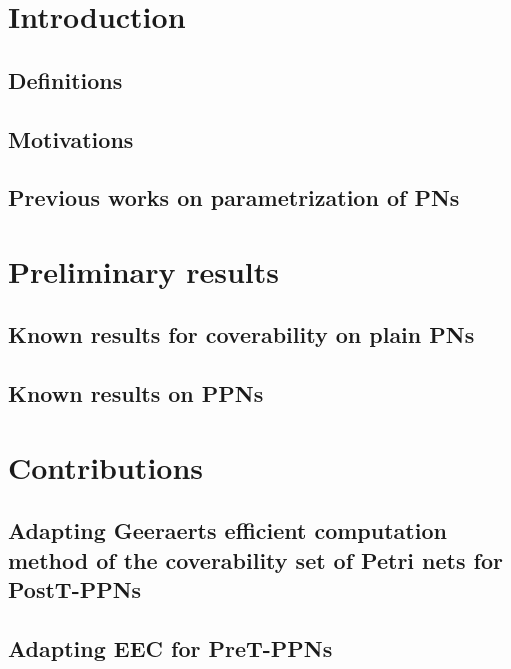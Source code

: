 \documentclass[11pt,a4paper,oneside,draft]{book}
\theoremstyle{plain}
\theoremstyle{definition}
\theoremstyle{remark}
\begin{document}
\thispagestyle{empty} 
\setcounter{page}{0}
\tableofcontents
\acresetall

\mainmatter
\setcounter{page}{1}

\chapter{Introduction}

\section{Definitions}

\section{Motivations}


\section{Previous works on parametrization of \acp{PN}}


\chapter{Preliminary results}
\section{Known results for coverability on plain \acp{PN}}

\section{Known results on \acp{PPN}}


\chapter{Contributions}
\section{Adapting Geeraerts efficient computation method of the coverability set of Petri nets for PostT-\acp{PPN}}
\section{Adapting \ac{EEC} for PreT-\acp{PPN}}

\vspace*{0.5cm}
\end{document}
